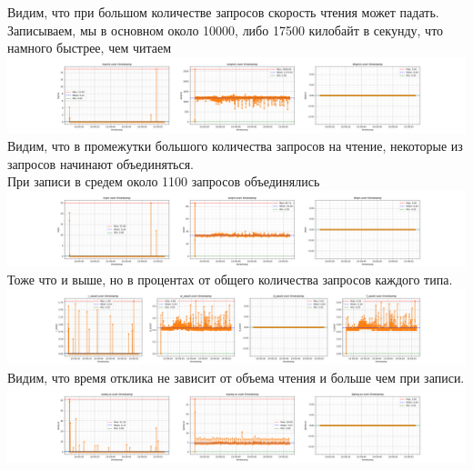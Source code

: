 Видим, что при большом количестве запросов скорость чтения может падать.\\
Записываем, мы в основном около 10000, либо 17500 килобайт в секунду, что намного быстрее, чем читаем\\
\includegraphics[width=\textwidth]{./io/image/io-uring_3.png}
Видим, что в промежутки большого количества запросов на чтение, некоторые из запросов начинают объединяться.\\
При записи в средем около 1100 запросов объединялись\\
\includegraphics[width=\textwidth]{./io/image/io-uring_4.png}
Тоже что и выше, но в процентах от общего количества запросов каждого типа.
\includegraphics[width=\textwidth]{./io/image/io-uring_5.png}
Видим, что время отклика не зависит от объема чтения и больше чем при записи.
\includegraphics[width=\textwidth]{./io/image/io-uring_6.png}
